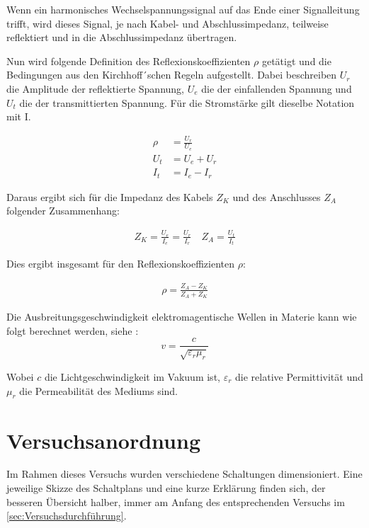 \documentclass[11pt,ngerman]{scrartcl}
\begin{document}
\noindent Wenn ein harmonisches Wechselspannungssignal auf das Ende einer Signalleitung trifft, wird dieses Signal, je nach Kabel- und Abschlussimpedanz, teilweise reflektiert und in die Abschlussimpedanz übertragen.

\noindent Nun wird folgende Definition des Reflexionskoeffizienten $\rho$
getätigt und die Bedingungen aus den Kirchhoff´schen Regeln aufgestellt. Dabei
beschreiben $U_{r}$ die Amplitude der reflektierte Spannung, $U_e$ die der
einfallenden Spannung und $U_t$ die der transmittierten Spannung. Für  die
Stromstärke gilt dieselbe Notation mit I.

\begin{align}
	\rho & = \frac{U_r}{U_e} \label{eq:rho_durch_u} \\
	U_t  & = U_e + U_r                              \\
	I_t  & = I_e - I_r
\end{align}

\noindent Daraus ergibt sich für die Impedanz des Kabels $Z_K$ und des Anschlusses $Z_A$ folgender Zusammenhang:

\begin{align}
	Z_K = \frac{U_e}{I_e}= \frac{U_r}{I_r} \quad Z_A = \frac{U_t}{I_t}
\end{align}

\noindent Dies ergibt insgesamt für den Reflexionskoeffizienten $\rho$: \cite{Demtroeder2013}

\begin{align}
	\rho = \frac{Z_A - Z_K}{Z_A + Z_K} \label{eq:rho_durch_z}
\end{align}

\noindent Die Ausbreitungsgeschwindigkeit elektromagentische Wellen in Materie
kann wie folgt berechnet werden, siehe \cite{gerthsen}:
\begin{equation}
	v = \frac{c}{\sqrt{\varepsilon_r \mu_r}}
	\label{eq:c_in_m}
\end{equation}

Wobei $c$ die Lichtgeschwindigkeit im Vakuum ist, $\varepsilon_r$ die relative
Permittivität und $\mu_r$ die Permeabilität des Mediums sind.

\newpage

\section{Versuchsanordnung}\label{sec:Versuchsanordnung}

Im Rahmen dieses Versuchs wurden verschiedene Schaltungen dimensioniert. Eine jeweilige Skizze des Schaltplans und eine kurze Erklärung finden sich, der besseren Übersicht halber, immer am Anfang des entsprechenden Versuchs im \autoref{sec:Versuchsdurchführung}.
\end{document}

